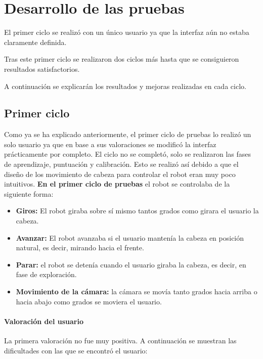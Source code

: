 \documentclass[twoside, 11pt]{epstfg}
\begin{document}
\section{Desarrollo de las pruebas}
El primer ciclo se realizó con un único usuario ya que la interfaz aún no estaba claramente definida.

Tras este primer ciclo se realizaron dos ciclos más hasta que se consiguieron resultados satisfactorios.

A continuación se explicarán los resultados y mejoras realizadas en cada ciclo.

\subsection{Primer ciclo}

Como ya se ha explicado anteriormente, el primer ciclo de pruebas lo realizó un solo usuario ya que en base a sus valoraciones se modificó la interfaz prácticamente por completo.
El ciclo no se completó, solo se realizaron las fases de aprendizaje, puntuación y calibración. Esto se realizó así debido a que el diseño de los movimiento de cabeza para controlar el robot eran muy poco intuitivos.
\textbf{En el primer ciclo de pruebas} el robot se controlaba de la siguiente forma:
\begin{itemize}
	\item \textbf{Giros:} El robot giraba sobre sí mismo tantos grados como girara el usuario la cabeza.
	\item \textbf{Avanzar:} El robot avanzaba si el usuario mantenía la cabeza en posición natural, es decir, mirando hacia el frente.
	\item \textbf{Parar:} el robot se detenía cuando el usuario giraba la cabeza, es decir, en fase de exploración.
	\item \textbf{Movimiento de la cámara:} la cámara se movía tanto grados hacia arriba o hacia abajo como grados se moviera el usuario.
\end{itemize}

\paragraph{Valoración del usuario}
La primera valoración no fue muy positiva. A continuación se muestran las dificultades con las que se encontró el usuario:
\end{document}
